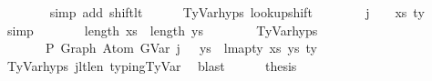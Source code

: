 \begin{isabellebody}
\ \ \ \ \ \ \isamarkupfalse%
\ {\isacharparenleft}{\kern0pt}simp\ add{\isacharcolon}{\kern0pt}\ shift{\isacharunderscore}{\kern0pt}lt{\isacharparenright}{\kern0pt}\isanewline
\isanewline
\ \ \ \ \isamarkupfalse%
\ TyVar{\isachardot}{\kern0pt}hyps{\isacharparenleft}{\kern0pt}{}{\isacharparenright}{\kern0pt}\ lookup{\isacharunderscore}{\kern0pt}shift\isanewline
\ \ \ \ \isamarkupfalse%
\ {\isachardoublequoteopen}{\isasymGamma}{}\ {\isacharbang}{\kern0pt}\ {\isacharparenleft}{\kern0pt}j\ {\isacharminus}{\kern0pt}\ {}{\isacharparenright}{\kern0pt}\ {\isacharequal}{\kern0pt}\ {\isacharparenleft}{\kern0pt}xs{\isacharprime}{\kern0pt}{\isacharcomma}{\kern0pt}\ ty{\isacharprime}{\kern0pt}{\isacharparenright}{\kern0pt}{\isachardoublequoteclose}\ \isamarkupfalse%
\ simp\isanewline
\isanewline
\ \ \ \ \isamarkupfalse%
\ \isamarkupfalse%
\ {\isachardoublequoteopen}length\ xs{\isacharprime}{\kern0pt}\ {\isacharequal}{\kern0pt}\ length\ ys{\isachardoublequoteclose}\isanewline
\ \ \ \ \ \ \isamarkupfalse%
\ TyVar{\isachardot}{\kern0pt}hyps{\isacharparenleft}{\kern0pt}{}{\isacharparenright}{\kern0pt}\ \isakeywordONE{{\isachardot}{\kern0pt}}\isamarkupfalse%
\isanewline
\isanewline
\ \ \ \ \isamarkupfalse%
\ \isamarkupfalse%
\isanewline
\ \ \ \ \ \ {\isachardoublequoteopen}{\isasymGamma}{}\ {\isasymturnstile}{\isacharbraceleft}{\kern0pt}P{\isacharbraceright}{\kern0pt}\ Graph\ {\isacharparenleft}{\kern0pt}Atom\ {\isacharparenleft}{\kern0pt}GVar\ {\isacharparenleft}{\kern0pt}j\ {\isacharminus}{\kern0pt}\ {}{\isacharparenright}{\kern0pt}{\isacharparenright}{\kern0pt}\ ys{\isacharparenright}{\kern0pt}\ {\isacharcolon}{\kern0pt}\ lmap{\isacharunderscore}{\kern0pt}ty\ xs{\isacharprime}{\kern0pt}\ ys\ ty{\isacharprime}{\kern0pt}{\isachardoublequoteclose}\isanewline
\ \ \ \ \ \isamarkupfalse%
\ TyVar{\isachardot}{\kern0pt}hyps{\isacharparenleft}{\kern0pt}{}{\isacharcomma}{\kern0pt}{}{\isacharcomma}{\kern0pt}{}{\isacharparenright}{\kern0pt}\ j{}{\isacharunderscore}{\kern0pt}lt{\isacharunderscore}{\kern0pt}len{\isacharunderscore}{\kern0pt}{\isasymGamma}{}\ typing{\isachardot}{\kern0pt}TyVar\ \isamarkupfalse%
\ blast\isanewline
\isanewline
\ \ \ \ \isamarkupfalse%
\ {\isacharquery}{\kern0pt}thesis\isanewline
\ \ \ \ \ \ \isamarkupfalse%

\end{isabellebody}
